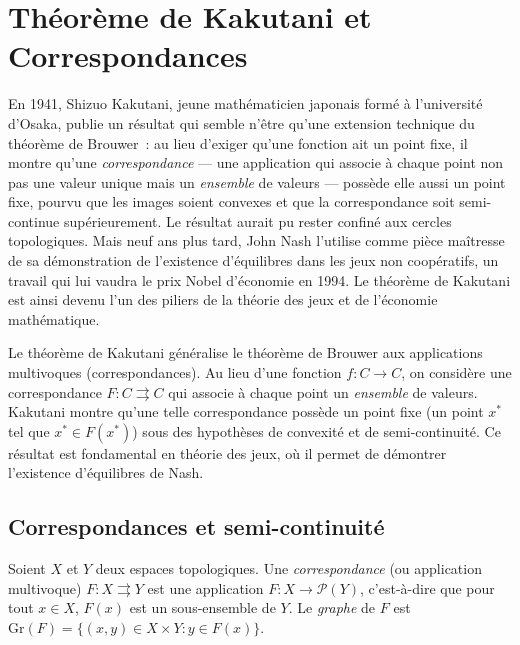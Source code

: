 \chapter{Th\'eor\`eme de Kakutani et Correspondances}
\label{ch:kakutani}

En 1941, Shizuo Kakutani, jeune math\'ematicien japonais form\'e \`a l'universit\'e d'Osaka, publie un r\'esultat qui semble n'\^etre qu'une extension technique du th\'eor\`eme de Brouwer~: au lieu d'exiger qu'une fonction ait un point fixe, il montre qu'une \emph{correspondance} --- une application qui associe \`a chaque point non pas une valeur unique mais un \emph{ensemble} de valeurs --- poss\`ede elle aussi un point fixe, pourvu que les images soient convexes et que la correspondance soit semi-continue sup\'erieurement. Le r\'esultat aurait pu rester confin\'e aux cercles topologiques. Mais neuf ans plus tard, John Nash l'utilise comme pi\`ece ma\^itresse de sa d\'emonstration de l'existence d'\'equilibres dans les jeux non coop\'eratifs, un travail qui lui vaudra le prix Nobel d'\'economie en 1994. Le th\'eor\`eme de Kakutani est ainsi devenu l'un des piliers de la th\'eorie des jeux et de l'\'economie math\'ematique.

\begin{intuition}
Le th\'eor\`eme de Kakutani g\'en\'eralise le th\'eor\`eme de Brouwer aux applications
multivoques (correspondances). Au lieu d'une fonction $f\colon C \to C$, on consid\`ere
une correspondance $F\colon C \rightrightarrows C$ qui associe \`a chaque point un
\emph{ensemble} de valeurs. Kakutani montre qu'une telle correspondance poss\`ede un point
fixe (un point $x^*$ tel que $x^* \in F(x^*)$) sous des hypoth\`eses de convexit\'e et de
semi-continuit\'e. Ce r\'esultat est fondamental en th\'eorie des jeux, o\`u il permet de
d\'emontrer l'existence d'\'equilibres de Nash.
\end{intuition}

\section{Correspondances et semi-continuit\'e}

\begin{definition}
Soient $X$ et $Y$ deux espaces topologiques. Une \emph{correspondance} (ou application
multivoque) $F\colon X \rightrightarrows Y$ est une application $F\colon X \to \mathcal{P}(Y)$,
c'est-\`a-dire que pour tout $x \in X$, $F(x)$ est un sous-ensemble de $Y$.
Le \emph{graphe} de $F$ est $\mathrm{Gr}(F) = \{(x,y) \in X \times Y : y \in F(x)\}$.
\end{definition}

